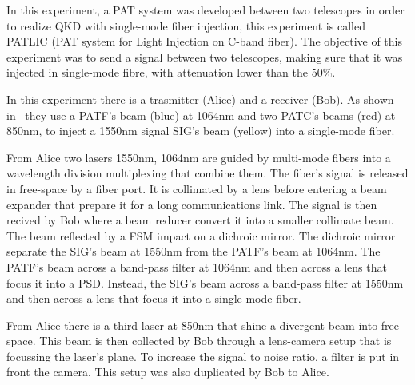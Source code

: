 In this experiment, a PAT system was developed between two telescopes in order to realize QKD with single-mode fiber injection, this experiment is called PATLIC (PAT system for Light Injection on C-band fiber).
The objective of this experiment was to send a signal between two telescopes, making sure that it was injected in single-mode fibre, with attenuation lower than the 50\%.

In this experiment there is a trasmitter (Alice) and a receiver (Bob). As shown in~ they use a PATF's beam (blue) at 1064nm and two PATC's beams (red) at 850nm, to inject a 1550nm signal SIG's beam (yellow) into a single-mode fiber.

From Alice two lasers 1550nm, 1064nm are guided by multi-mode fibers into a wavelength division multiplexing that combine them. The fiber's signal is released in free-space by a fiber port. It is collimated by a lens before entering a beam expander that prepare it for a long communications link. The signal is then recived by Bob where a beam reducer convert it into a smaller collimate beam. The beam reflected by a FSM impact on a dichroic mirror. The dichroic mirror separate the SIG's beam at 1550nm from the PATF's beam at 1064nm. The PATF's beam across a band-pass filter at 1064nm and then across a lens that focus it into a PSD. Instead, the SIG's beam across a band-pass filter at 1550nm and then across a lens that focus it into a single-mode fiber.

From Alice there is a third laser at 850nm that shine a divergent beam into free-space. This beam is then collected by Bob through a lens-camera setup that is focussing the laser's plane. To increase the signal to noise ratio, a filter is put in front the camera. This setup was also duplicated by Bob to Alice.

